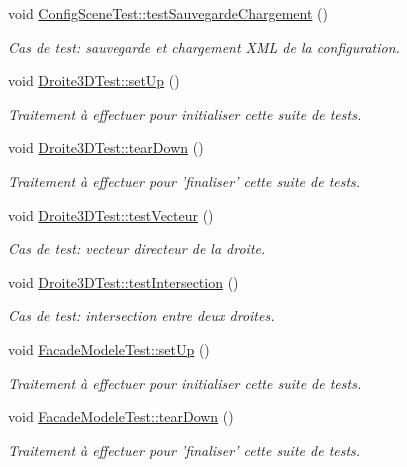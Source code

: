 \begin{DoxyCompactItemize}
void \hyperlink{group__inf2990_ga0f09d52bc30d87f18b0341e1052efb74}{Config\-Scene\-Test\-::test\-Sauvegarde\-Chargement} ()
\begin{DoxyCompactList}\small\item\em Cas de test\-: sauvegarde et chargement X\-M\-L de la configuration. \end{DoxyCompactList}\item 
void \hyperlink{group__inf2990_ga2058c915e823fa8ab26bad2c22554565}{Droite3\-D\-Test\-::set\-Up} ()
\begin{DoxyCompactList}\small\item\em Traitement à effectuer pour initialiser cette suite de tests. \end{DoxyCompactList}\item 
void \hyperlink{group__inf2990_gac9305147cf292b41834fabd24e57b976}{Droite3\-D\-Test\-::tear\-Down} ()
\begin{DoxyCompactList}\small\item\em Traitement à effectuer pour 'finaliser' cette suite de tests. \end{DoxyCompactList}\item 
void \hyperlink{group__inf2990_gaeae69515feaa3c448b7489289910c467}{Droite3\-D\-Test\-::test\-Vecteur} ()
\begin{DoxyCompactList}\small\item\em Cas de test\-: vecteur directeur de la droite. \end{DoxyCompactList}\item 
void \hyperlink{group__inf2990_gaa99e4b9c5f0916cef3b8dfe7ab8a4e9d}{Droite3\-D\-Test\-::test\-Intersection} ()
\begin{DoxyCompactList}\small\item\em Cas de test\-: intersection entre deux droites. \end{DoxyCompactList}\item 
void \hyperlink{group__inf2990_gaee2f8265a20182be11bcf8839311a8d8}{Facade\-Modele\-Test\-::set\-Up} ()
\begin{DoxyCompactList}\small\item\em Traitement à effectuer pour initialiser cette suite de tests. \end{DoxyCompactList}\item 
void \hyperlink{group__inf2990_ga864b95ee45f0949e36b3670ebe6fb7c4}{Facade\-Modele\-Test\-::tear\-Down} ()
\begin{DoxyCompactList}\small\item\em Traitement à effectuer pour 'finaliser' cette suite de tests. \end{DoxyCompactList}\item 

\end{DoxyCompactItemize}
